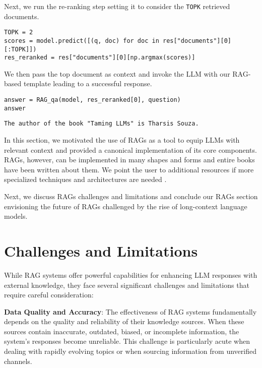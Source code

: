 Next, we run the re-ranking step setting it to consider the \texttt{TOPK} retrieved documents.

\begin{verbatim}
TOPK = 2
scores = model.predict([(q, doc) for doc in res["documents"][0][:TOPK]])
res_reranked = res["documents"][0][np.argmax(scores)]
\end{verbatim}

We then pass the top document as context and invoke the LLM with our RAG-based template leading to a successful response.

\begin{verbatim}
answer = RAG_qa(model, res_reranked[0], question)
answer
\end{verbatim}

\begin{verbatim}
The author of the book "Taming LLMs" is Tharsis Souza.
\end{verbatim}
In this section, we motivated the use of RAGs as a tool to equip LLMs with relevant context and provided a canonical implementation of its core components. RAGs, however, can be implemented in many shapes and forms and entire books have been written about them. We point the user to additional resources if more specialized techniques and architectures are needed .

Next, we discuss RAGs challenges and limitations and conclude our RAGs section envisioning the future of RAGs challenged by the rise of long-context language models.

\section{Challenges and Limitations}

While RAG systems offer powerful capabilities for enhancing LLM responses with external knowledge, they face several significant challenges and limitations that require careful consideration:
 
\textbf{Data Quality and Accuracy}: The effectiveness of RAG systems fundamentally depends on the quality and reliability of their knowledge sources. When these sources contain inaccurate, outdated, biased, or incomplete information, the system's responses become unreliable. This challenge is particularly acute when dealing with rapidly evolving topics or when sourcing information from unverified channels.
 
